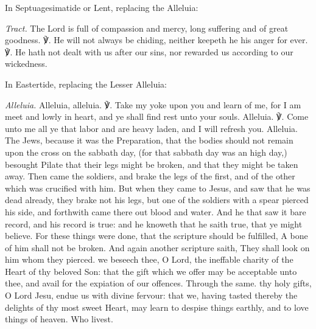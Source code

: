 \begin{rubric}
{In Septuagesimatide or Lent, replacing the Alleluia:}
\end{rubric}\par\noindent
\textit{Tract.} The Lord is full of compassion and mercy, long suffering and of great goodness. ℣. He will not always be chiding, neither keepeth he his anger for ever. ℣. He hath not dealt with us after our sins, nor rewarded us according to our wickedness.
\begin{rubric}
{In Eastertide, replacing the Lesser Alleluia:}
\end{rubric}\par\noindent
\textit{Alleluia.} Alleluia, alleluia. ℣. Take my yoke upon you and learn of me, for I am meet and lowly in heart, and ye shall find rest unto your souls. Alleluia. ℣. Come unto me all ye that labor and are heavy laden, and I will refresh you. Alleluia.
 The Jews, because it was the Preparation, that the bodies should not remain upon the cross on the sabbath day, (for that sabbath day was an high day,) besought Pilate that their legs might be broken, and that they might be taken away. Then came the soldiers, and brake the legs of the first, and of the other which was crucified with him. But when they came to Jesus, and saw that he was dead already, they brake not his legs, but one of the soldiers with a spear pierced his side, and forthwith came there out blood and water. And he that saw it bare record, and his record is true: and he knoweth that he saith true, that ye might believe. For these things were done, that the scripture should be fulfilled, A bone of him shall not be broken. And again another scripture saith, They shall look on him whom they pierced.
\secret
{} we beseech thee, O Lord, the ineffable charity of the Heart of thy beloved Son: that the gift which we offer may be acceptable unto thee, and avail for the expiation of our offences. Through the same.
\postcommunion
{} thy holy gifts, O Lord Jesu, endue us with divine fervour: that we, having tasted thereby the delights of thy most sweet Heart, may learn to despise things earthly, and to love things of heaven. Who livest.

